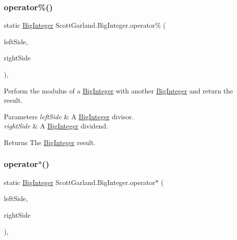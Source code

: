 \subsubsection{\texorpdfstring{operator\%()}{operator\%()}}
{\footnotesize\ttfamily static \hyperlink{class_scott_garland_1_1_big_integer}{Big\+Integer} Scott\+Garland.\+Big\+Integer.\+operator\% (\begin{DoxyParamCaption}\item[{\hyperlink{class_scott_garland_1_1_big_integer}{Big\+Integer}}]{left\+Side,  }\item[{\hyperlink{class_scott_garland_1_1_big_integer}{Big\+Integer}}]{right\+Side }\end{DoxyParamCaption})\hspace{0.3cm}{\ttfamily [inline]}, {\ttfamily [static]}}



Perform the modulus of a \hyperlink{class_scott_garland_1_1_big_integer}{Big\+Integer} with another \hyperlink{class_scott_garland_1_1_big_integer}{Big\+Integer} and return the result. 


\begin{DoxyParams}{Parameters}
{\em left\+Side} & A \hyperlink{class_scott_garland_1_1_big_integer}{Big\+Integer} divisor.\\
\hline
{\em right\+Side} & A \hyperlink{class_scott_garland_1_1_big_integer}{Big\+Integer} dividend.\\
\hline
\end{DoxyParams}
\begin{DoxyReturn}{Returns}
The \hyperlink{class_scott_garland_1_1_big_integer}{Big\+Integer} result.
\end{DoxyReturn}
\mbox{\label{class_scott_garland_1_1_big_integer_ae893cd71c07858e3ced194d364a5c1ba}} 
\subsubsection{\texorpdfstring{operator$\ast$()}{operator*()}}
{\footnotesize\ttfamily static \hyperlink{class_scott_garland_1_1_big_integer}{Big\+Integer} Scott\+Garland.\+Big\+Integer.\+operator$\ast$ (\begin{DoxyParamCaption}\item[{\hyperlink{class_scott_garland_1_1_big_integer}{Big\+Integer}}]{left\+Side,  }\item[{\hyperlink{class_scott_garland_1_1_big_integer}{Big\+Integer}}]{right\+Side }\end{DoxyParamCaption})\hspace{0.3cm}{\ttfamily [inline]}, {\ttfamily [static]}}



